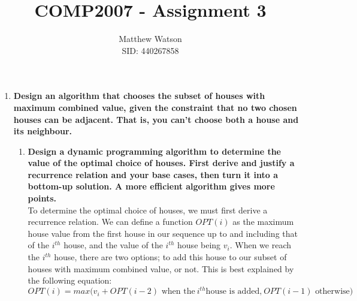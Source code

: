 \documentclass[11pt, oneside]{article}   	%
\title{COMP2007 - Assignment 3}
\author{Matthew Watson\\ SID: 440267858}
\date{}							%
\begin{document}
\maketitle

\begin{enumerate}
	\item \textbf{Design an algorithm that chooses the subset of houses with maximum combined value, given the constraint that no two chosen houses can be adjacent. That is, you can't choose both a house and its neighbour.}
	\begin{enumerate}
		\item \textbf{Design a dynamic programming algorithm to determine the value of the optimal choice of houses. First derive and justify a recurrence relation and your base cases, then turn it into a bottom-up solution. A more efficient algorithm gives more points.}\\
		To determine the optimal choice of houses, we must first derive a recurrence relation. We can define a function $OPT(i)$ as the maximum house value from the first house in our sequence up to and including that of the $i^{th}$ house, and the value of the $i^{th}$ house being $v_i$. When we reach the $i^{th}$ house, there are two options; to add this house to our subset of houses with maximum combined value, or not. This is best explained by the following equation:
		\[OPT(i) = max(v_i + OPT(i-2) \textrm{ when the}\ i^{th} \textrm{house is added,}\ OPT(i-1) \textrm{ otherwise)} \]
		

\end{enumerate}
\end{enumerate}
\end{document}
